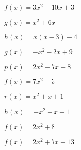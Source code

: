 \documentclass{report}
\theoremstyle{definition}
\begin{document}
\begin{enumerate}

\begin{minipage}[t]{0.45\linewidth}
\item  $f(x)=3x^2-10x+3$\\
\end{minipage}
\hfill
\begin{minipage}[t]{0.45\linewidth}
\item  $g(x)=x^2+6x$\\
\end{minipage}

\vspace{1cm}

\begin{minipage}[t]{0.45\linewidth}
\item  $h(x)=x(x-3)-4$\\
\end{minipage}
\hfill
\begin{minipage}[t]{0.45\linewidth}
\item  $g(x)=-x^2-2x+9$\\
\end{minipage}

\vspace{1cm}

\begin{minipage}[t]{0.45\linewidth}
\item  $p(x)=2x^2-7x-8$\\
\end{minipage}
\hfill
\begin{minipage}[t]{0.45\linewidth}
\item  $f(x)=7x^2-3$\\
\end{minipage}

\vspace{1cm}

\begin{minipage}[t]{0.45\linewidth}
\item  $r(x)=x^2+x+1$\\
\end{minipage}
\hfill
\begin{minipage}[t]{0.45\linewidth}
\item  $h(x)=-x^2-x-1$\\
\end{minipage}

\vspace{1cm}

\begin{minipage}[t]{0.45\linewidth}
\item  $f(x)=2x^2+8$\\
\end{minipage}
\hfill
\begin{minipage}[t]{0.45\linewidth}
\item  $f(x)=2x^2+7x-13$\\
\end{minipage}

\vspace{0.5cm}

\end{enumerate}
\end{document}
